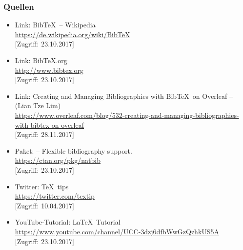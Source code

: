 \documentclass[a4paper,10pt, bibtotoc]{beamer}
\begin{document}
\begin{frame}[allowframebreaks]
\frametitle{Quellen}

{\footnotesize
	
	\begin{itemize}
		
%		

		\item Link: Bib\TeX\ -- Wikipedia\\
		\url{https://de.wikipedia.org/wiki/BibTeX}\\
		{[}Zugriff: 23.10.2017]
		
		\item Link: Bib\TeX .org\\
		\url{http://www.bibtex.org}\\
		{[}Zugriff: 23.10.2017]
		
		\item Link: Creating and Managing Bibliographies with Bib\TeX\ on Overleaf -- (Lian Tze Lim)\\
		\url{https://www.overleaf.com/blog/532-creating-and-managing-bibliographies-with-bibtex-on-overleaf}\\
		{[}Zugriff: 28.11.2017]
	
		\item Paket:  -- Flexible bibliography support.\\
		\url{https://ctan.org/pkg/natbib}\\
		{[}Zugriff: 23.10.2017]

		\item Twitter: \TeX\ tips\\
		\url{https://twitter.com/textip} \\
		{[}Zugriff: 10.04.2017]

		\item YouTube-Tutorial: \LaTeX\ Tutorial\\
		\url{https://www.youtube.com/channel/UCC-3dzj6dfbWwGzQzhkUS5A}\\
		{[}Zugriff: 23.10.2017]
		
		

\end{itemize}}
\end{frame}
\end{document}
